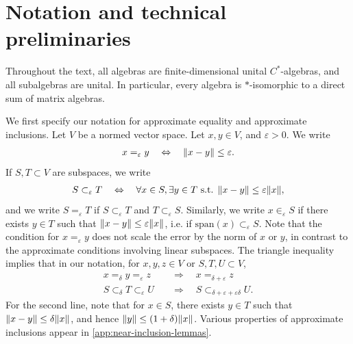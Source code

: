\documentclass[11pt,reqno]{amsart}
\theoremstyle{definition}
\theoremstyle{remark}
\numberwithin{equation}{section}
\newcommand{\eps}{\varepsilon}
\DeclarePairedDelimiter\norm{\lVert}{\rVert}
\newcommand{\approxSub}[1]{\subset_{#1}}
\newcommand{\approxEq}[1]{=_{#1}}
\newcommand{\approxIn}[1]{\in_{#1}}
\begin{document}
\section{Notation and technical preliminaries}\label{sec:notation}
Throughout the text, all algebras are finite-dimensional unital $C^*$-algebras, and all subalgebras are unital.
In particular, every algebra is $*$-isomorphic to a direct sum of matrix algebras.

We first specify our notation for approximate equality and approximate inclusions.
Let $V$ be a normed vector space.
Let $x,y \in V$, and $\eps > 0$. We write
\begin{align*}
    x \approxEq{\eps} y \quad \Leftrightarrow \quad  \norm{x - y} \leq \eps.
\end{align*}
If $S,T \subset V$ are subspaces, we write
\begin{align*}
    S \approxSub{\eps} T \quad \Leftrightarrow \quad  \forall x \in S, \exists y \in T \text{ s.t. } \norm{x-y} \leq \eps \norm{x},
\end{align*}
and we write $S \approxEq\eps T$ if $S \approxSub\eps T$ and $T \approxSub\eps S$.
Similarly, we write $x \approxIn{\eps} S$ if there exists $y \in T$ such that $\norm{x-y} \leq \eps\norm{x}$, i.e. if $\mathrm{span}(x) \approxSub{\eps} S$.
Note that the condition for $x \approxEq{\eps} y$ does not scale the error by the norm of $x$ or $y$, in contrast to the approximate conditions involving linear subspaces.
The triangle inequality implies that in our notation, for $x,y,z \in V$ or $S,T,U \subset V$,
\begin{align*}
    x \approxEq{\delta} y \approxEq{\eps} z \quad &\Rightarrow \quad x \approxEq{\delta + \eps} z \\
    S \approxSub{\delta} T \approxSub{\eps} U  \quad &\Rightarrow \quad S \approxSub{\delta + \eps + \eps \delta} U.
\end{align*}
For the second line, note that for $x \in S$, there exists $y \in T$ such that $\norm{x-y} \leq \delta\norm{x}$, and hence $\norm{y} \leq (1 + \delta)\norm{x}$.
Various properties of approximate inclusions appear in \cref{app:near-inclusion-lemmas}.
\end{document}
